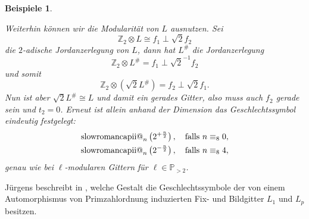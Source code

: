 \documentclass[12pt,a4paper,halfparskip,headsepline,bibtotocnumbered]{scrreprt}
\makeatletter
\theoremstyle{nummermitklammern}
\newtheorem{beispiele}[defsatzusw]{Beispiele}
\theoremstyle{nonumberbreak}
\newcommand{\Z}{\mathbb{Z}}
\renewcommand{\P}{\mathbb{P}}
\newcommand{\ii}{\text{\expandafter\@slowromancap\romannumeral 2@}}
\makeatother
\begin{document}
\begin{beispiele}
\begin{enumerate}[label=(\roman*)]
			Weiterhin können wir die Modularität von $L$ ausnutzen. Sei
			\begin{equation*}
				\Z_2 \otimes L \cong f_1 \perp \sqrt{2} f_2
			\end{equation*}
			die $2$-adische Jordanzerlegung von $L$, dann hat $L^\#$ die Jordanzerlegung
			\begin{equation*}
				\Z_2 \otimes L^\# = f_1 \perp \sqrt{2}^{-1} f_2
			\end{equation*}
			und somit
			\begin{equation*}
				\Z_2 \otimes (\sqrt{2} L^\#) = f_2 \perp \sqrt{2} f_1.
			\end{equation*}
			Nun ist aber $\sqrt{2} L^\# \cong L$ und damit ein gerades Gitter, also muss auch $f_2$ gerade sein und $t_2 = 0$. Erneut ist allein anhand der Dimension das Geschlechtssymbol eindeutig festgelegt:
			\begin{align*}
				\ii_n \left( 2^{+\frac{n}{2}} \right), \quad \text{falls } n \equiv_8 0,\\
				\ii_n \left( 2^{-\frac{n}{2}} \right), \quad \text{falls } n \equiv_8 4,\\
			\end{align*}
			genau wie bei $\ell$-modularen Gittern für $\ell \in \P_{>2}$.
	\end{enumerate}
\end{beispiele}

Jürgens beschreibt in \cite[Abschnitt (4.1.3)]{juergens}, welche Gestalt die Geschlechtssymbole der von einem Automorphismus von Primzahlordnung induzierten Fix- und Bildgitter $L_1$ und $L_p$ besitzen.
\end{document}
